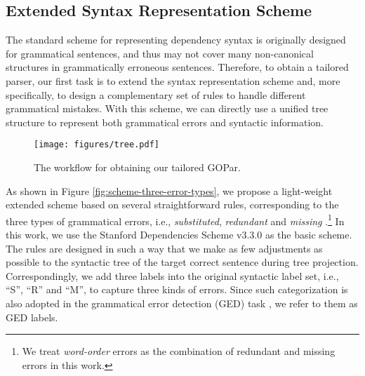 \documentclass[11pt]{article}
\begin{document}
\subsection{Extended Syntax Representation Scheme} 
\label{GOPar Scheme}  

The standard scheme for representing dependency syntax is originally designed for grammatical sentences, 
 and thus may not cover many non-canonical structures in grammatically erroneous sentences. 
Therefore, to obtain a tailored parser, our first task is to extend the syntax representation scheme and, more specifically, to design a complementary set of rules to handle different grammatical mistakes. 
With this scheme, we can directly use a unified tree structure to represent both grammatical errors and syntactic information. 

\begin{figure*}[ht!]
\centering
\texttt{[image: figures/tree.pdf]}
\caption{The workflow for obtaining our tailored  GOPar. 
}
\label{fig:tree}
\end{figure*} 
As shown in Figure \ref{fig:scheme-three-error-types}, we propose a light-weight extended scheme based on several straightforward rules, 
corresponding to the three types of grammatical errors, i.e., \textit{substituted}, \textit{redundant} and \textit{missing} \citep{bryant2017automatic}.\footnote{
We treat \textit{word-order} errors as the combination of redundant and missing errors in this work. 
} 
In this work, we use the Stanford Dependencies Scheme v3.3.0 \cite{DBLP:conf/iclr/DozatM17} as the basic scheme. 
The rules are designed in such a way that 
we make as few adjustments as possible to the  syntactic tree of the target correct sentence during tree projection. 
Correspondingly, we add three labels into the original syntactic label set, i.e., ``S'', ``R'' and ``M'', to capture three kinds of errors.  
Since such categorization is also adopted in the grammatical error detection (GED) task \citep{DBLP:conf/emnlp/YuanTD021}, we refer to them as GED labels.  
\end{document}
